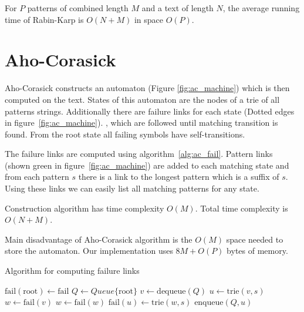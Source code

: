 \documentclass[final]{beamer}
\begin{document}
\begin{poster}
For $P$ patterns of combined length $M$  and a text of length $N$, the average running time of Rabin-Karp is $O(N+M)$ in space $O(P)$.


\section{Aho-Corasick}

Aho-Corasick constructs an automaton (Figure \ref{fig:ac_machine}) which is then computed on the text.
States of this automaton are the nodes of a trie of all patterns strings.
Additionally there are failure links for each state (Dotted edges in figure~\ref{fig:ac_machine}).
, which are followed until matching transition is found. From the root state all failing symbols
have self-transitions.


The failure links are computed using algorithm~\ref{alg:ac_fail}.
Pattern links (shown green in figure~\ref{fig:ac_machine}) are added to each
matching state and from each pattern $s$ there is a link to the longest pattern which
is a suffix of $s$.
Using these links we can easily list all matching patterns for
any state.
\newcolumn

Construction algorithm has time complexity $O(M)$. Total time complexity is $O(N+M)$.

Main disadvantage of Aho-Corasick algorithm is the $O(M)$ space needed to store the automaton.
Our implementation uses $8M+O(P)$ bytes of memory.

\vspace{5mm}

\begin{algorithm} [H]
\small
\caption{Algorithm for computing failure links}
\label{alg:ac_fail}

\begin{algorithmic}[1]
\State $ \text{fail}(\text{root}) \gets \text{fail}$
\State $Q \gets Queue\{\text{root}\}$
    \State $v \gets \text{dequeue}(Q) $
        \State $u \gets \text{trie}(v,s)$ 
        \State $w \gets \text{fail}(v)$ 
            \State $w \gets \text{fail}(w)$ 
        \EndWhile
        \State $ \text{fail}(u) \gets \text{trie}(w,s)$
        \State $\text{enqueue}(Q,u)$
    \EndFor
\EndWhile
\end{algorithmic}
\end{algorithm}


\end{poster}
\end{document}
